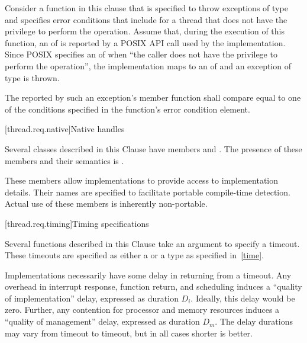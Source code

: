 \begin{example}
Consider a function in this clause that is specified to throw exceptions of type
 and specifies error conditions that include
 for a thread that does not have the privilege to
perform the operation. Assume that, during the execution of this function, an 
of  is reported by a POSIX API call used by the implementation. Since POSIX
specifies an  of  when ``the caller does not have the privilege
to perform the operation'', the implementation maps  to an
 of  and an exception
of type  is thrown.
\end{example}

\pnum
The  reported by such an exception's  member function
shall compare equal to one of the conditions specified in the function's error condition
element.

[thread.req.native]{Native handles}

\pnum
Several classes described in this Clause have members  and
. The presence of these members and their semantics is
.
\begin{note} These members allow implementations to provide access
to implementation details. Their names are specified to facilitate portable compile-time
detection. Actual use of these members is inherently non-portable. \end{note}

[thread.req.timing]{Timing specifications}

\pnum
Several functions described in this Clause take an argument to specify a timeout. These
timeouts are specified as either a  or a  type as
specified in~\ref{time}.

\pnum
Implementations necessarily have some delay in returning from a timeout. Any overhead in
interrupt response, function return, and scheduling induces a ``quality of implementation''
delay, expressed as duration $D_i$. Ideally, this delay would be zero. Further, any contention for
processor and memory resources induces a ``quality of management'' delay, expressed as duration
$D_m$. The delay durations may vary from timeout to timeout, but in all cases shorter is better.

